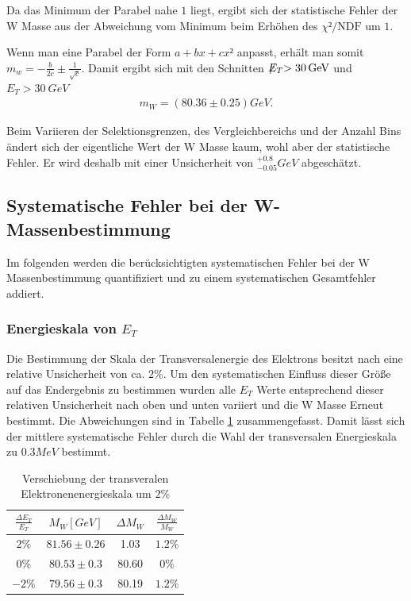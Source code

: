 \documentclass[a4paper,12pt]{article}
\newcommand{\met}{\ensuremath{\not\mathrel{E}}_T}
\begin{document}
Da das Minimum der Parabel nahe $1$ liegt, ergibt sich der statistische Fehler der W Masse aus der Abweichung vom Minimum beim Erhöhen des
$χ²/\text{NDF}$ um $1$.

Wenn man eine Parabel der Form $a + bx + cx²$ anpasst, erhält man somit $m_w = -\frac{b}{2c} ±
\frac{1}{\sqrt{c}}$.
Damit ergibt sich mit den Schnitten $\met > \SI{30}{GeV}$ und $E_{T} > \SI{30}{GeV}$
\begin{align*}
	m_W =  ( 80.36 ± 0.25  ) \si{GeV}.
\end{align*}

Beim Variieren der Selektionsgrenzen, des Vergleichbereichs und der Anzahl Bins ändert sich der
eigentliche Wert der W Masse kaum, wohl aber der statistische Fehler. Er wird deshalb mit einer
Unsicherheit von $^{+0.8}_{-0.05}\si{GeV}$ abgeschätzt.

\subsection{Systematische Fehler bei der W-Massenbestimmung}
\label{sysunc}
Im folgenden werden die berücksichtigten systematischen Fehler bei der W Massenbestimmung quantifiziert und zu einem systematischen Gesamtfehler 
addiert.
\subsubsection*{Energieskala von $E_{T}$}
Die Bestimmung der Skala der Transversalenergie des Elektrons besitzt nach \cite{Abachi:1996ey} eine relative Unsicherheit von ca. $2\%$. Um den systematischen Einfluss
dieser Größe auf das Endergebnis zu bestimmen wurden alle $E_{T}$ Werte entsprechend dieser relativen Unsicherheit nach oben und unten variiert und die
W Masse Erneut bestimmt. Die Abweichungen sind in Tabelle \ref{tab:syset} zusammengefasst. Damit lässt sich der mittlere systematische Fehler durch die 
Wahl der transversalen Energieskala zu $0.3MeV$ bestimmt.
\begin{table}[h]
	\centering
	\begin{tabular}{c| c c c}
		$\frac{\Delta E_{T}}{E_{T}}$ & $M_{W} [GeV]$ & $\Delta M_{W}$ &$\frac{\Delta M_{W}}{M_{W}}$\\
		\hline
		$2\%$ & $81.56\pm 0.26$ & 1.03 & $1.2\%$\\
		$0\%$ & $80.53\pm 0.3$ & 80.60 & $0\%$ \\
		$-2\%$ & $79.56\pm 0.3$ & 80.19 &$1.2\%$ 
	\end{tabular}
	\caption{Verschiebung der transveralen Elektronenenergieskala um $2\%$}
	\label{tab:syset}
\end{table}
\end{document}
